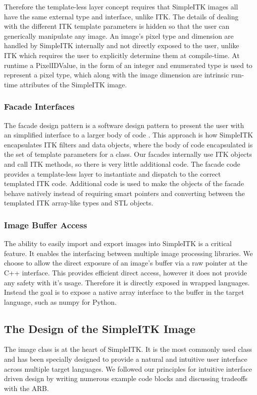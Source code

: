\documentclass{frontiersMED} %
\begin{document}
Therefore the template-less layer concept requires that SimpleITK
images all have the same external type and interface, unlike ITK. The
details of dealing with the different ITK template parameters is
hidden so that the user can generically manipulate any image. An
image's pixel type and dimension are handled by SimpleITK internally
and not directly exposed to the user, unlike ITK which requires the
user to explicitly determine them at compile-time. At runtime a
PixelIDValue, in the form of an integer and enumerated type is used to
represent a pixel type, which along with the image dimension are
intrinsic run-time attributes of the SimpleITK image.

\subsubsection{Facade Interfaces}
The facade design pattern is a software design pattern to present the
user with an simplified interface to a larger body of code
\cite{Gamma1995}. This approach is how SimpleITK encapsulates ITK filters
and data objects, where  the body of code encapsulated is the set of
template parameters for a class. Our facades internally use ITK
objects and call ITK methods, so there is very little additional
code. The facade code provides a template-less layer to instantiate
and dispatch to the correct templated ITK code. Additional code is
used to make the objects of the facade behave natively instead of
requiring smart pointers and converting between the templated ITK
array-like types and STL objects.

\subsubsection{Image Buffer Access}
The ability to easily import and export images into SimpleITK is a
critical feature. It enables the interfacing between multiple image
processing libraries. We choose to allow the direct exposure of an
image's buffer via a raw pointer at the C++ interface. This provides
efficient direct access, however it does not provide any safety with
it's usage. Therefore it is directly exposed in wrapped
languages. Instead the goal is to expose a native array interface to
the buffer in the target language, such as numpy for Python.

\subsection{The Design of the SimpleITK Image}
The image class is at the heart of SimpleITK. It is the most commonly
used class and has been specially designed to provide a natural and
intuitive user interface across multiple target languages. We followed
our principles for intuitive interface driven design by writing
numerous example code blocks and discussing tradeoffs with the ARB.
\end{document}
